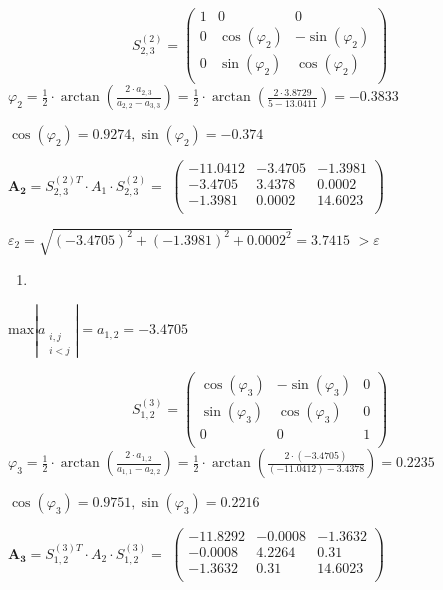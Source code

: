 \documentclass[10pt, a4paper]{scrartcl}
\begin{document}
\[S_{2,3}^{(2)} = \begin{pmatrix} 
1 & 0 & 0\\
0 & \cos(\varphi_{2}) & -\sin(\varphi_{2})\\
0 & \sin(\varphi_{2}) & \cos(\varphi_{2})\\
\end{pmatrix}\]
\(\displaystyle \varphi_{2} = \frac{1}{2} \cdot \arctan\left(\frac{2 \cdot a_{2,3}}{a_{2,2} - a_{3,3}}\right) = \frac{1}{2} \cdot \arctan\left(\frac{2 \cdot 3.8729}{5 - 13.0411}\right) = -0.3833\)

\(\displaystyle \cos(\varphi_2) = 0.9274, \sin(\varphi_2) = -0.374\)

\(\displaystyle \mathbf{A_2} = S_{2,3}^{(2)T} \cdot A_1 \cdot S_{2,3}^{(2)} =\)
\(\displaystyle \begin{pmatrix} -11.0412 & -3.4705 & -1.3981\\ -3.4705 & 3.4378 & 0.0002\\ -1.3981 & 0.0002 & 14.6023\\ \end{pmatrix}\)

\(\displaystyle \varepsilon_2 = \sqrt{(-3.4705)^2 + (-1.3981)^2 + 0.0002^2 } = \mathbf{3.7415}\)
\(\displaystyle > \varepsilon\)

\begin{enumerate}
\def\labelenumi{\arabic{enumi})}
\setcounter{enumi}{2}
\item
\end{enumerate}

\(\displaystyle \text{max} |a_{\substack{i,j \\ i<j}}| = a_{1,2} = -3.4705\)

\[S_{1,2}^{(3)} = \begin{pmatrix} 
\cos(\varphi_{3}) & -\sin(\varphi_{3}) & 0\\
\sin(\varphi_{3}) & \cos(\varphi_{3}) & 0\\
0 & 0 & 1\\
\end{pmatrix}\]
\(\displaystyle \varphi_{3} = \frac{1}{2} \cdot \arctan\left(\frac{2 \cdot a_{1,2}}{a_{1,1} - a_{2,2}}\right) = \frac{1}{2} \cdot \arctan\left(\frac{2 \cdot (-3.4705)}{(-11.0412) - 3.4378}\right) = 0.2235\)

\(\displaystyle \cos(\varphi_3) = 0.9751, \sin(\varphi_3) = 0.2216\)

\(\displaystyle \mathbf{A_3} = S_{1,2}^{(3)T} \cdot A_2 \cdot S_{1,2}^{(3)} =\)
\(\displaystyle \begin{pmatrix} -11.8292 & -0.0008 & -1.3632\\ -0.0008 & 4.2264 & 0.31\\ -1.3632 & 0.31 & 14.6023\\ \end{pmatrix}\)
\end{document}
